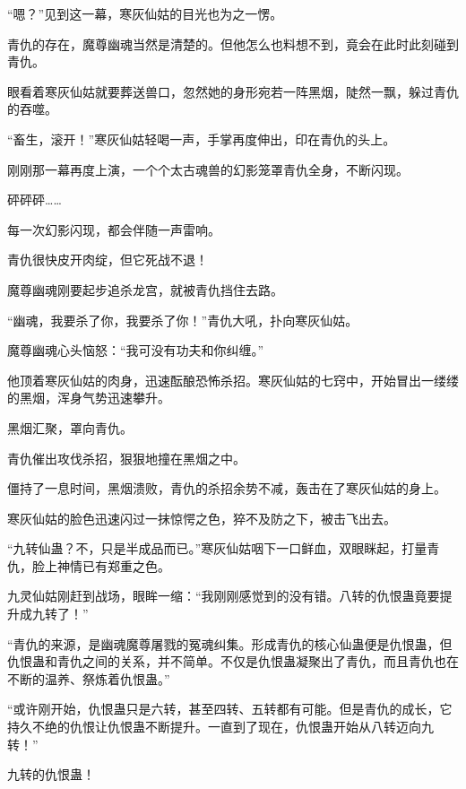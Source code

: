 \begin{this_body}
“嗯？”见到这一幕，寒灰仙姑的目光也为之一愣。

青仇的存在，魔尊幽魂当然是清楚的。但他怎么也料想不到，竟会在此时此刻碰到青仇。

眼看着寒灰仙姑就要葬送兽口，忽然她的身形宛若一阵黑烟，陡然一飘，躲过青仇的吞噬。

“畜生，滚开！”寒灰仙姑轻喝一声，手掌再度伸出，印在青仇的头上。

刚刚那一幕再度上演，一个个太古魂兽的幻影笼罩青仇全身，不断闪现。

砰砰砰……

每一次幻影闪现，都会伴随一声雷响。

青仇很快皮开肉绽，但它死战不退！

魔尊幽魂刚要起步追杀龙宫，就被青仇挡住去路。

“幽魂，我要杀了你，我要杀了你！”青仇大吼，扑向寒灰仙姑。

魔尊幽魂心头恼怒：“我可没有功夫和你纠缠。”

他顶着寒灰仙姑的肉身，迅速酝酿恐怖杀招。寒灰仙姑的七窍中，开始冒出一缕缕的黑烟，浑身气势迅速攀升。

黑烟汇聚，罩向青仇。

青仇催出攻伐杀招，狠狠地撞在黑烟之中。

僵持了一息时间，黑烟溃败，青仇的杀招余势不减，轰击在了寒灰仙姑的身上。

寒灰仙姑的脸色迅速闪过一抹惊愕之色，猝不及防之下，被击飞出去。

“九转仙蛊？不，只是半成品而已。”寒灰仙姑咽下一口鲜血，双眼眯起，打量青仇，脸上神情已有郑重之色。

九灵仙姑刚赶到战场，眼眸一缩：“我刚刚感觉到的没有错。八转的仇恨蛊竟要提升成九转了！”

“青仇的来源，是幽魂魔尊屠戮的冤魂纠集。形成青仇的核心仙蛊便是仇恨蛊，但仇恨蛊和青仇之间的关系，并不简单。不仅是仇恨蛊凝聚出了青仇，而且青仇也在不断的温养、祭炼着仇恨蛊。”

“或许刚开始，仇恨蛊只是六转，甚至四转、五转都有可能。但是青仇的成长，它持久不绝的仇恨让仇恨蛊不断提升。一直到了现在，仇恨蛊开始从八转迈向九转！”

九转的仇恨蛊！

\end{this_body}

